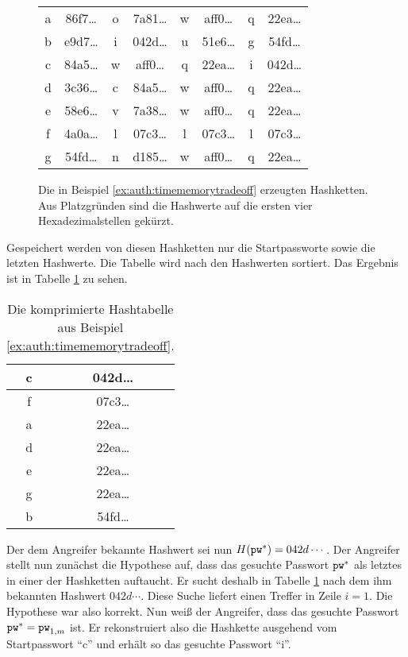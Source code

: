 \begin{beispiel}
\begin{figure}[h!]
\begin{center}
	\begin{tabular}{c@{$\;\hasharrow\;$}c@{$\;\VRTF\;$}c@{$\;\hasharrow\;$}c@{$\;\VRTF\;$}c@{$\;\hasharrow\;$}c@{$\;\VRTF\;$}c@{$\;\hasharrow\;$}c}
a & 86f7\ldots & o & 7a81\ldots & w & aff0\ldots & q & 22ea\ldots\\ b &
e9d7\ldots & i & 042d\ldots & u & 51e6\ldots & g & 54fd\ldots\\ c &
84a5\ldots & w & aff0\ldots & q & 22ea\ldots & i & 042d\ldots\\ d &
3c36\ldots & c & 84a5\ldots & w & aff0\ldots & q & 22ea\ldots\\ e &
58e6\ldots & v & 7a38\ldots & w & aff0\ldots & q & 22ea\ldots\\ f &
4a0a\ldots & l & 07c3\ldots & l & 07c3\ldots & l & 07c3\ldots\\ g &
54fd\ldots & n & d185\ldots & w & aff0\ldots & q & 22ea\ldots\\
	\end{tabular}
	\caption{Die in Beispiel \ref{ex:auth:timememorytradeoff}
erzeugten Hashketten. Aus Platzgründen sind die Hashwerte auf die ersten
vier Hexadezimalstellen gekürzt.}
	\label{fig:auth:timememorytradeoff:hashchains}
\end{center}
\end{figure}

Gespeichert werden von diesen Hashketten nur die Startpassworte sowie
die letzten Hashwerte. Die Tabelle wird nach den Hashwerten
sortiert. Das Ergebnis ist in Tabelle
\ref{table:auth:timememorytradeoff:hashtable} zu sehen.

\begin{table}[h!]
	\begin{center}
		\begin{tabular}{|c|c|} \hline c & 042d\ldots\\\hline f &
07c3\ldots\\\hline a & 22ea\ldots\\\hline d & 22ea\ldots\\\hline e &
22ea\ldots\\\hline g & 22ea\ldots\\\hline b & 54fd\ldots\\\hline
		\end{tabular}
	\end{center}
	\caption{Die komprimierte Hashtabelle aus Beispiel
\ref{ex:auth:timememorytradeoff}.}
	\label{table:auth:timememorytradeoff:hashtable}
\end{table}

Der dem Angreifer bekannte Hashwert sei nun $H(\texttt{pw}^*) = 042d\cdots$.
Der Angreifer stellt nun zunächst die Hypothese auf, dass das gesuchte
Passwort $\texttt{pw}^*$ als letztes in einer der Hashketten auftaucht. Er sucht
deshalb in Tabelle \ref{table:auth:timememorytradeoff:hashtable} nach
dem ihm bekannten Hashwert $042d\cdots$. Diese Suche liefert einen
Treffer in Zeile $i = 1$. Die Hypothese war also korrekt. Nun weiß der
Angreifer, dass das gesuchte Passwort $\texttt{pw}^* = \texttt{pw}_{1,m}$ ist. Er
rekonstruiert also die Hashkette ausgehend vom Startpasswort "`c"' und
erhält so das gesuchte Passwort "`i"'.
\end{beispiel}

